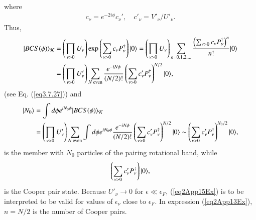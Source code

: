 \begin{subappendices}
\begin{align}
\end{align}
where
\begin{align}\label{eq2App12Ex}
 c_\nu=e^{-2i\phi}c_\nu',\quad c'_\nu=V'_\nu/U'_\nu.
\end{align}
Thus,
\begin{align}\label{eq2App13Ex}
\nonumber|{BCS(\phi)} \rangle_{\mathcal K}&=\left(\prod_{\nu>0}U_\nu\right)\exp\left(\sum_{\nu>0}c_\nu P_\nu^\dagger\right)|{0} \rangle=\left(\prod_{\nu>0}U_\nu\right)\sum_{n=0,1,2,\dots}\frac{\left(\sum_{\nu>0}c_\nu P^\dagger_\nu\right)^n}{n!}|{0} \rangle\\
&=\left(\prod_{\nu>0}U'_\nu\right)\sum_{N \text{ even}}\frac{e^{-iN\phi}}{(N/2)!}\left(\sum_{\nu>0}c'_\nu P_\nu^\dagger\right)^{N/2}|{0} \rangle,
\end{align}
(see Eq. (\ref{eq3.7.27})) and
\begin{align}\label{eq2App14Ex}
\nonumber|{N_0} \rangle&=\int d\phi e^{iN_0\phi}|{BCS(\phi)} \rangle_{\mathcal K}\\
&=\left(\prod_{\nu>0}U'_\nu\right)\sum_{N \text{ even}}\int d\phi e^{iN_0\phi}\frac{e^{-iN\phi}}{(N/2)!}\left(\sum_{\nu>0}c'_\nu P_\nu^\dagger\right)^{N/2}|{0} \rangle\sim\left(\sum_{\nu>0}c'_\nu P_\nu^\dagger\right)^{N_0/2}|{0} \rangle,
\end{align}
is the member with $N_0$ particles of the pairing rotational band, while
\begin{align}\label{eq2App15Ex}
\left(\sum_{\nu>0}c'_\nu P_\nu^\dagger\right)\ket{0}, \idx{Cooper pair!--state}
\end{align}
is the Cooper pair state. Because $U'_\nu\to 0$ for $\epsilon\ll \epsilon_F$, (\ref{eq2App15Ex}) is to be interpreted to be valid for values of $\epsilon_\nu$ close to $\epsilon_F$. In expression (\ref{eq2App13Ex}), $n=N/2$ is the number of Cooper pairs.



\end{subappendices}

